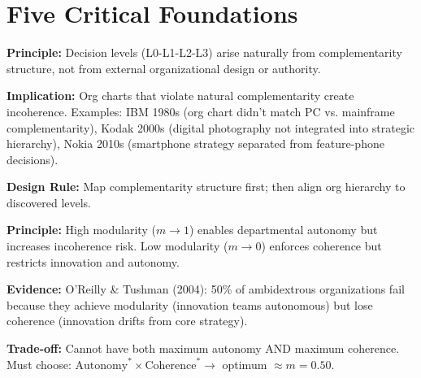 
\section{Five Critical Foundations}

\begin{tcolorbox}[colback=blue!5!white, colframe=blue!75!black, title=Critical Foundation 1: Hierarchy Emerges, Not Imposed]

\textbf{Principle:} Decision levels (L0-L1-L2-L3) arise naturally from complementarity structure, not from external organizational design or authority.

\textbf{Implication:} Org charts that violate natural complementarity create incoherence. Examples: IBM 1980s (org chart didn't match PC vs. mainframe complementarity), Kodak 2000s (digital photography not integrated into strategic hierarchy), Nokia 2010s (smartphone strategy separated from feature-phone decisions).

\textbf{Design Rule:} Map complementarity structure first; then align org hierarchy to discovered levels.

\end{tcolorbox}

\begin{tcolorbox}[colback=blue!5!white, colframe=blue!75!black, title=Critical Foundation 2: Modularity-Coherence Trade-off]

\textbf{Principle:} High modularity ($m \to 1$) enables departmental autonomy but increases incoherence risk. Low modularity ($m \to 0$) enforces coherence but restricts innovation and autonomy.

\textbf{Evidence:} O'Reilly \& Tushman (2004): 50\% of ambidextrous organizations fail because they achieve modularity (innovation teams autonomous) but lose coherence (innovation drifts from core strategy).

\textbf{Trade-off:} Cannot have both maximum autonomy AND maximum coherence. Must choose: $\text{Autonomy}^* \times \text{Coherence}^* \to$ optimum $\approx m=0.50$.

\end{tcolorbox}

